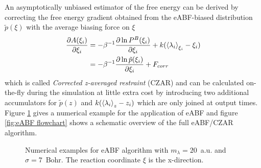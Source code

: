 An asymptotically unbiased estimator of the free energy can be derived by correcting the free energy gradient obtained from the eABF-biased distribution $\tilde{p}(\xi)$ with the average biasing force on $\xi$
\begin{equation}
  \begin{split}
  \frac{\partial A(\xi_i)}{\partial \xi_i} &= -\beta^{-1}\frac{\partial \ln P^B(\xi_i)}{\partial \xi_i} + k(\braket{\lambda_i}_{\xi_i}-\xi_{i}) \\
  &= -\beta^{-1}\frac{\partial \ln \tilde{p}(\xi_i)}{\partial \xi_i} + F_{corr}
\end{split}
  \label{eq:CZAR}
\end{equation}
which is called \textit{Corrected z-averaged restraint} (CZAR) and can be calculated on-the-fly during the simulation at little extra cost by introducing two additional accumulators for $\tilde{p}(z)$ and $k(\braket{\lambda_i}_{z}-z_{i})$ which are only joined at output times.\autocite{lesage2017smoothed} Figure \ref{fig:eABF traj} gives a numerical example for the application of eABF and figure \ref{fig:eABF flowchart} shows a schematic overview of the full eABF/CZAR algorithm.

\begin{figure}[H]
    \centering
    \caption{Numerical examples for eABF algorithm with $m_\lambda=20$~a.u. and $\sigma=7$~Bohr. The reaction coordinate $\xi$ is the x-direction. }
\label{fig:eABF traj}%
\end{figure}

